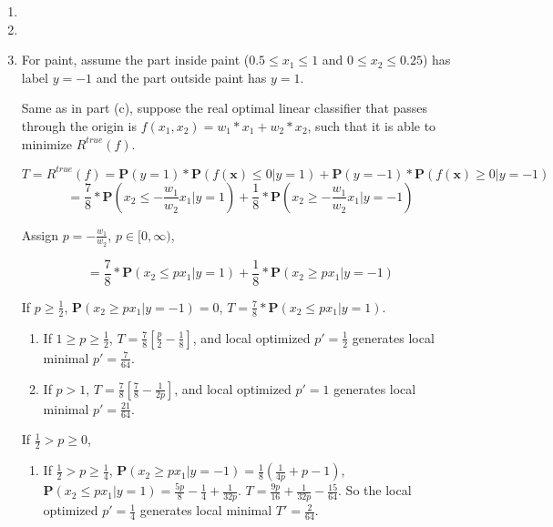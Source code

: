 \documentclass[paper=letter, fontsize=12pt]{article}
\begin{document}
\begin{enumerate}[label=(\alph*)]
	\item 
	
	\item 
	
	\item For paint, assume the part inside paint ($0.5 \leq x_1 \leq 1$ and $0 \leq x_2 \leq 0.25$) has label $y = -1$ and the part outside paint has $y = 1$.
	 
	Same as in part (c), suppose the real optimal linear classifier that passes through the origin is $f(x_1, x_2) = w_1 * x_1 + w_2 * x_2$, such that it is able to minimize $R^{true}(f)$.
	
	\begin{equation}
	T = R^{true}(f) = \mathbf{P}(y = 1) * \mathbf{P}(f(\mathbf{x}) \leq 0 | y = 1) + \mathbf{P}(y = -1) * \mathbf{P}(f(\mathbf{x}) \geq 0 | y = -1)
	\end{equation}
	\begin{equation}
	= \frac{7}{8} * \mathbf{P}(x_2 \leq -\frac{w_1}{w_2} x_1 | y = 1) + \frac{1}{8} * \mathbf{P}(x_2 \geq -\frac{w_1}{w_2} x_1 | y = -1)
	\end{equation}
	
	Assign $p = -\frac{w_1}{w_2}$, $p \in [0, \infty)$,
	
	\begin{equation}
	= \frac{7}{8} * \mathbf{P}(x_2 \leq p x_1 | y = 1) + \frac{1}{8} * \mathbf{P}(x_2 \geq p x_1 | y = -1)
	\end{equation}
	
	If $p \geq \frac{1}{2}$, $\mathbf{P}(x_2 \geq p x_1 | y = -1) = 0$, $T = \frac{7}{8} * \mathbf{P}(x_2 \leq p x_1 | y = 1) $.
	
	\begin{enumerate}[label=(\roman*)]
		\item If $1 \geq p \geq \frac{1}{2}$, $T = \frac{7}{8}[\frac{p}{2} - \frac{1}{8}]$, and local optimized $p' = \frac{1}{2}$ generates local minimal $p' = \frac{7}{64}$.
		
		\item If $p > 1$, $T = \frac{7}{8}[\frac{7}{8} - \frac{1}{2p}]$, and local optimized $p' = 1$ generates local minimal $p' = \frac{21}{64}$.
	\end{enumerate}

	If $\frac{1}{2} > p \geq 0$,
	
	\begin{enumerate}[label=(\roman*)]
		\item If $\frac{1}{2} > p \geq \frac{1}{4}$,  $\mathbf{P}(x_2 \geq p x_1 | y = -1) = \frac{1}{8} (\frac{1}{4p} + p - 1)$, $\mathbf{P}(x_2 \leq p x_1 | y = 1) = \frac{5p}{8} - \frac{1}{4} + \frac{1}{32p}$. $T = \frac{9p}{16} + \frac{1}{32p} - \frac{15}{64}$. So the local optimized $p' = \frac{1}{4}$ generates local minimal $T' = \frac{2}{64}$.
		

\end{enumerate}
\end{enumerate}
\end{document}
